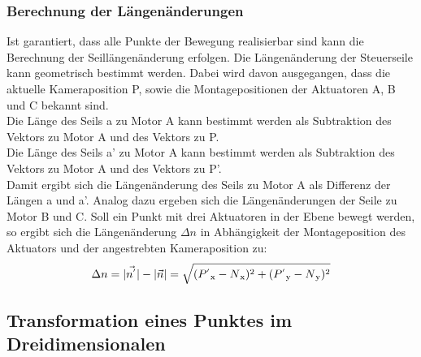\documentclass[a4paper, 12pt]{article}
\begin{document}
			\subsubsection{Berechnung der Längenänderungen}
				Ist garantiert, dass alle Punkte der Bewegung realisierbar sind kann die Berechnung der Seillängenänderung erfolgen. 
				Die Längenänderung der Steuerseile kann geometrisch bestimmt werden.
				Dabei wird davon ausgegangen, dass die aktuelle Kameraposition P, sowie die Montagepositionen der Aktuatoren A, B und C bekannt sind.\\
				Die Länge des Seils a zu Motor A kann bestimmt werden als Subtraktion des Vektors zu Motor A und des Vektors zu P.\\
				Die Länge des Seils a' zu Motor A kann bestimmt werden als Subtraktion des Vektors zu Motor A und des Vektors zu P'.\\
				Damit ergibt sich die Längenänderung des Seils zu Motor A als Differenz der Längen a und a'.
				Analog dazu ergeben sich die Längenänderungen der Seile zu Motor B und C.
				Soll ein Punkt mit drei Aktuatoren in der Ebene bewegt werden,
				so ergibt sich die Längenänderung $\Delta n$ in Abhängigkeit der Montageposition des Aktuators und der angestrebten Kameraposition zu:
				\begin{align}
					\Delta n =
					|\vec{n^{'}}|-|\vec{n}|=
					\sqrt{
					(P^{'}\textsubscript{x}-N\textsubscript{x})^2+
					(P^{'}\textsubscript{y}-N\textsubscript{y})^2
					}
				\end{align}
		\subsection{Transformation eines Punktes im Dreidimensionalen}	
\end{document}
